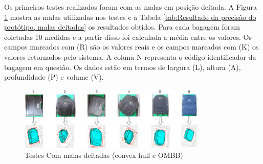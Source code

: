     Os primeiros testes realizados foram com as malas em posição deitada. A Figura \ref{fig:Malas_Deitadas} mostra as malas utilizadas nos testes e a Tabela \ref{tab:Resultado da precisão do protótipo, malas deitadas} os resultados obtidos. Para cada bagagem foram coletadas 10 medidas e a partir disso foi calculada a média entre os valores. Os campos marcados com (R) são os valores reais e os campos marcados com (K) os valores retornados pelo sistema. A coluna N representa o código identificador da bagagem em questão. Os dados estão em termos de largura (L), altura (A), profundidade (P) e volume (V).

        \begin{figure}[h]
           \centering
           \includegraphics[width=0.8\textwidth]{imagens/imagens_tabelas/resultadosMalasDeitadas/Malas_Deitadas.png} 
           \caption{Testes Com malas deitadas (convex hull e OMBB)}
           \label{fig:Malas_Deitadas}
        \end{figure}


    
\begin{table}[h!]
\centering
{}
\caption{Resultado da exatidão do protótipo, malas deitadas}
\label{tab:Resultado da precisão do protótipo, malas deitadas}
\end{table}

